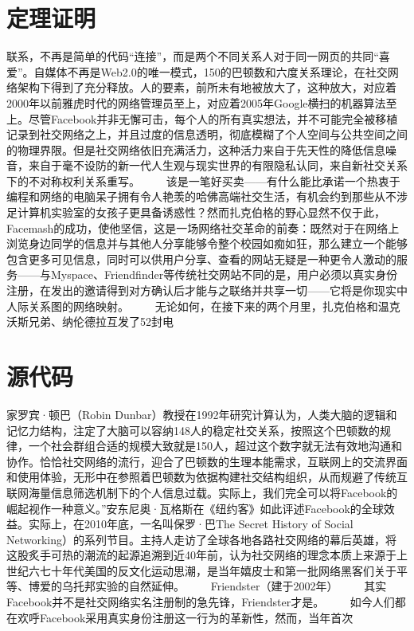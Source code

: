 
\section{定理证明} %

联系，不再是简单的代码“连接”，而是两个不同关系人对于同一网页的共同“喜爱”。自媒体不再是Web2.0的唯一模式，150的巴顿数和六度关系理论，在社交网络架构下得到了充分释放。人的要素，前所未有地被放大了，这种放大，对应着2000年以前雅虎时代的网络管理员至上，对应着2005年Google横扫的机器算法至上。尽管Facebook并非无懈可击，每个人的所有真实想法，并不可能完全被移植记录到社交网络之上，并且过度的信息透明，彻底模糊了个人空间与公共空间之间的物理界限。但是社交网络依旧充满活力，这种活力来自于先天性的降低信息噪音，来自于毫不设防的新一代人生观与现实世界的有限隐私认同，来自新社交关系下的不对称权利关系重写。
　　该是一笔好买卖——有什么能比承诺一个热衷于编程和网络的电脑呆子拥有令人艳羡的哈佛高端社交生活，有机会约到那些从不涉足计算机实验室的女孩子更具备诱惑性？然而扎克伯格的野心显然不仅于此，Facemash的成功，使他坚信，这是一场网络社交革命的前奏：既然对于在网络上浏览身边同学的信息并与其他人分享能够令整个校园如痴如狂，那么建立一个能够包含更多可见信息，同时可以供用户分享、查看的网站无疑是一种更令人激动的服务——与Myspace、Friendfinder等传统社交网站不同的是，用户必须以真实身份注册，在发出的邀请得到对方确认后才能与之联络并共享一切——它将是你现实中人际关系图的网络映射。
　　无论如何，在接下来的两个月里，扎克伯格和温克沃斯兄弟、纳伦德拉互发了52封电
 

\section{源代码} %


家罗宾·顿巴（Robin Dunbar）教授在1992年研究计算认为，人类大脑的逻辑和记忆力结构，注定了大脑可以容纳148人的稳定社交关系，按照这个巴顿数的规律，一个社会群组合适的规模大致就是150人，超过这个数字就无法有效地沟通和协作。恰恰社交网络的流行，迎合了巴顿数的生理本能需求，互联网上的交流界面和使用体验，无形中在参照着巴顿数为依据构建社交结构组织，从而规避了传统互联网海量信息筛选机制下的个人信息过载。实际上，我们完全可以将Facebook的崛起视作一种意义。”安东尼奥·瓦格斯在《纽约客》如此评述Facebook的全球效益。实际上，在2010年底，一名叫保罗·巴The Secret History of Social Networking）的系列节目。主持人走访了全球各地各路社交网络的幕后英雄，将这股炙手可热的潮流的起源追溯到近40年前，认为社交网络的理念本质上来源于上世纪六七十年代美国的反文化运动思潮，是当年嬉皮士和第一批网络黑客们关于平等、博爱的乌托邦实验的自然延伸。
　　Friendster（建于2002年）
　　其实Facebook并不是社交网络实名注册制的急先锋，Friendster才是。
　　如今人们都在欢呼Facebook采用真实身份注册这一行为的革新性，然而，当年首次